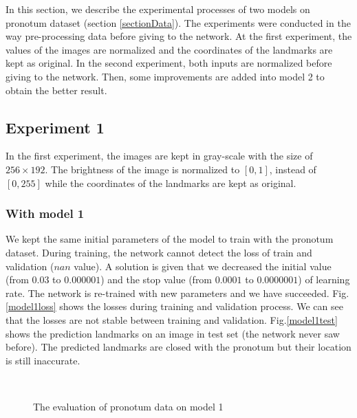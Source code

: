 \documentclass[12pt,a4paper]{article}
\begin{document}
In this section, we describe the experimental processes of two models on pronotum dataset (section \ref{sectionData}). The experiments were conducted in the way pre-processing data before giving to the network. At the first experiment, the values of the images are normalized and the coordinates of the landmarks are kept as original. In the second experiment, both inputs are normalized before giving to the network. Then, some improvements are added into model 2 to obtain the better result.
\subsection{Experiment 1}
In the first experiment, the images are kept in gray-scale with the size of $256 \times 192$. The brightness of the image is normalized to $[0,1]$, instead of $[0,255]$ while the coordinates of the landmarks are kept as original. 
\subsubsection{With model 1}
We kept the same initial parameters of the model to train with the pronotum dataset. During training, the network cannot detect the loss of train and validation ($nan$ value). A solution is given that we decreased the initial value (from $0.03$ to $0.000001$) and the stop value (from $0.0001$ to $0.0000001$) of learning rate. The network is re-trained with new parameters and we have succeeded. Fig.\ref{model1loss} shows the losses during training and validation process. We can see that the losses are not stable between training and validation. Fig.\ref{model1test} shows the prediction landmarks on an image in test set (the network never saw before). The predicted landmarks are closed with the pronotum but their location is still inaccurate.
\begin{figure}[h!]
\centering
{}~~
\caption{The evaluation of pronotum data on model 1}
\label{model1tl}
\end{figure}
\end{document}
